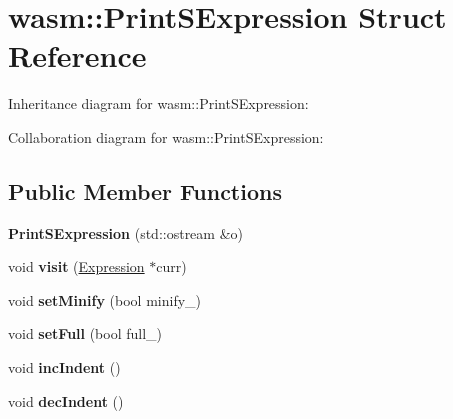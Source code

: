 \hypertarget{structwasm_1_1_print_s_expression}{}\section{wasm\+:\+:Print\+S\+Expression Struct Reference}
\label{structwasm_1_1_print_s_expression}


Inheritance diagram for wasm\+:\+:Print\+S\+Expression\+:


Collaboration diagram for wasm\+:\+:Print\+S\+Expression\+:
\subsection*{Public Member Functions}
\begin{DoxyCompactItemize}
\item 
\mbox{\label{structwasm_1_1_print_s_expression_af455db2e19fa31f79af013352640cae4}} 
{\bfseries Print\+S\+Expression} (std\+::ostream \&o)
\item 
\mbox{\label{structwasm_1_1_print_s_expression_ad964098e41d8020e313a8952f4aaa81d}} 
void {\bfseries visit} (\mbox{\hyperlink{classwasm_1_1_expression}{Expression}} $\ast$curr)
\item 
\mbox{\label{structwasm_1_1_print_s_expression_af44011fb61ae575c1d4fe5ceac4a1a39}} 
void {\bfseries set\+Minify} (bool minify\+\_\+)
\item 
\mbox{\label{structwasm_1_1_print_s_expression_aea0a216fa9dac47dc142decda889950c}} 
void {\bfseries set\+Full} (bool full\+\_\+)
\item 
\mbox{\label{structwasm_1_1_print_s_expression_aafb544d0a80ee67db6b7df8d626b4716}} 
void {\bfseries inc\+Indent} ()
\item 
\mbox{\label{structwasm_1_1_print_s_expression_afdb982629d61a5b3b34ec432eeb56b2d}} 
void {\bfseries dec\+Indent} ()
\item 
\mbox{\label{structwasm_1_1_print_s_expression_ab8c42fd420ed16ce0d974ac6e9053481}} 

\end{DoxyCompactItemize}
